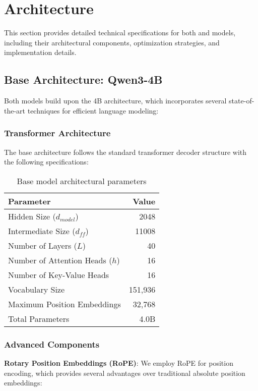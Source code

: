 \section{Architecture}
\label{sec:architecture}

This section provides detailed technical specifications for both \supra{} and \zennano{} models, including their architectural components, optimization strategies, and implementation details.

\subsection{Base Architecture: Qwen3-4B}

Both models build upon the \qwen{} 4B architecture, which incorporates several state-of-the-art techniques for efficient language modeling:

\subsubsection{Transformer Architecture}
The base architecture follows the standard transformer decoder structure with the following specifications:

\begin{table}[H]
\centering
\begin{tabular}{lr}
\toprule
Parameter & Value \\
\midrule
Hidden Size ($d_{model}$) & 2048 \\
Intermediate Size ($d_{ff}$) & 11008 \\
Number of Layers ($L$) & 40 \\
Number of Attention Heads ($h$) & 16 \\
Number of Key-Value Heads & 16 \\
Vocabulary Size & 151,936 \\
Maximum Position Embeddings & 32,768 \\
Total Parameters & 4.0B \\
\bottomrule
\end{tabular}
\caption{Base model architectural parameters}
\label{tab:base-architecture}
\end{table}

\subsubsection{Advanced Components}

\textbf{Rotary Position Embeddings (RoPE)}: We employ RoPE for position encoding, which provides several advantages over traditional absolute position embeddings:

